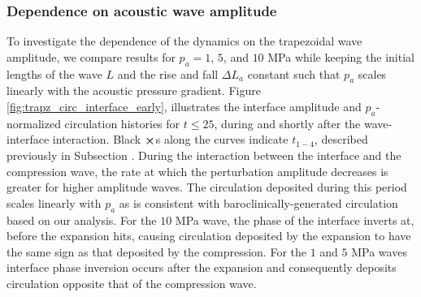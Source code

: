 \subsubsection{Dependence on acoustic wave amplitude}%
\label{subsubsec:amplitude_dependence}%
To investigate the dependence of the dynamics on the trapezoidal wave
amplitude, we compare results for $p_a=1$, $5$, and $10$ MPa while
keeping the initial lengths of the wave $L$ and the rise and fall
$\Delta L_a$ constant such that $p_a$ scales linearly with the
acoustic pressure gradient. Figure
\ref{fig:trapz_circ_interface_early}, illustrates the interface
amplitude and $p_a$-normalized circulation histories for $t\leq25$,
during and shortly after the wave-interface interaction. Black
$\boldsymbol{\times}$s along the curves indicate $t_{1-4}$, described
previously in Subsection \label{subsec:Qualitative}. During the
interaction between the interface and the compression wave, the rate
at which the perturbation amplitude decreases is greater for higher
amplitude waves. The circulation deposited during this period scales
linearly with $p_a$ as is consistent with baroclinically-generated
circulation based on our analysis. For the $10$ MPa wave, the phase of
the interface inverts at, before the expansion hits, causing
circulation deposited by the expansion to have the same sign as that
deposited by the compression. For the $1$ and $5$ MPa waves interface
phase inversion occurs after the expansion and consequently deposits
circulation opposite that of the compression wave.

